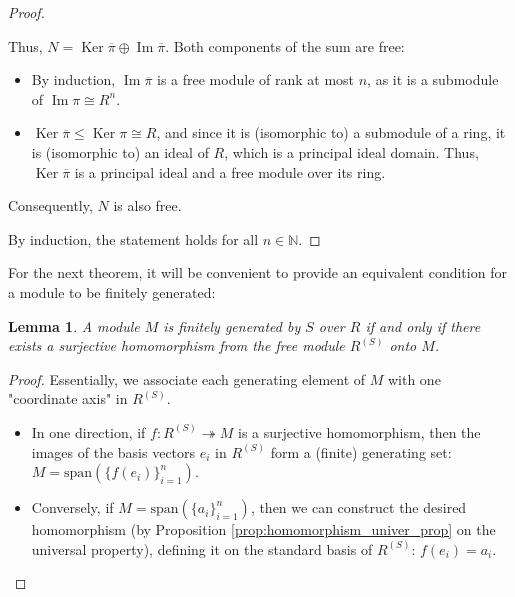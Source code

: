 \documentclass{article}
\newif\ifusemulticols
\theoremstyle{definition}
\theoremstyle{remark}
\theoremstyle{plain}
\theoremstyle{plain}
\newtheorem{lemma}[theorem]{Lemma}
\newenvironment{mymulticols}
    { \ifusemulticols \begin{multicols}{2} \fi }
    { \ifusemulticols \end{multicols} \fi }
\DeclareMathOperator{\Ker}{Ker}
\DeclareMathOperator{\image}{Im}
\newcommand{\N}{\mathbb{N}}
\begin{document}
\begin{mymulticols}
\begin{proof}
\begin{enumerate}

            Thus, $N = \Ker \overline{\pi} \oplus \image \overline{\pi}$. Both components of the sum are free:
            \begin{itemize}
                \item By induction, $\image \overline{\pi}$ is a free module of rank at most $n$, as
                    it is a submodule of $\image \pi \cong R^n$.
                \item $\Ker \overline{\pi} \le \Ker \pi \cong R$, and since it is (isomorphic to) a
                    submodule of a ring, it is (isomorphic to) an ideal of $R$, which is a principal
                    ideal domain. Thus, $\Ker \overline{\pi}$ is a principal ideal and a free module
                    over its ring.
            \end{itemize}
        Consequently, $N$ is also free.
    \end{enumerate}
    By induction, the statement holds for all $n \in \N$.
\end{proof}

For the next theorem, it will be convenient to provide an equivalent condition for a module to be
finitely generated:

\begin{lemma}
    A module $M$ is finitely generated by $S$ over $R$ if and only if there exists a surjective
    homomorphism from the free module $R^{(S)}$ onto $M$.
\end{lemma}
\begin{proof}
    Essentially, we associate each generating element of $M$ with one "coordinate axis" in
    $R^{(S)}$.

    \begin{itemize}
        \item In one direction, if $f : R^{(S)} \twoheadrightarrow M$ is a surjective homomorphism,
            then the images of the basis vectors $e_i$ in $R^{(S)}$ form a (finite) generating set: $M = \text{span}(\{f(e_i)\}_{i=1}^n)$.

        \item Conversely, if $M = \text{span}(\{a_i\}_{i=1}^n)$, then we can construct the desired
            homomorphism (by Proposition \ref{prop:homomorphism_univer_prop} on the universal
            property), defining it on the standard basis of $R^{(S)}$: $f(e_i) = a_i$.


\end{itemize}
\end{proof}
\end{mymulticols}
\end{document}

